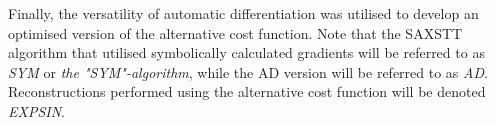 Finally, the versatility of automatic differentiation was utilised to develop an optimised version of the alternative cost function.
Note that the SAXSTT algorithm that utilised symbolically calculated gradients will be referred to as \emph{SYM} or \emph{the "SYM"-algorithm},
while the AD version will be referred to as \emph{AD}. Reconstructions performed using the alternative cost function will be denoted \emph{EXPSIN}.




